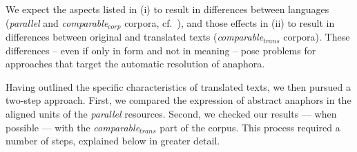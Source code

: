 \documentclass[output=paper]{LSP/langsci}
\begin{document}
We expect the aspects listed in (i) to result in differences between languages (\textit{parallel} and \textit{comparable$_{corp}$} corpora, cf.\ ), and those effects in (ii) to result in differences between original and translated texts (\textit{comparable$_{trans}$} corpora). These differences -- even if only in form and not in meaning -- pose problems for approaches that target the automatic resolution of anaphora. 


Having outlined the specific characteristics of translated texts, we then pursued a two-step approach.  First, we compared the expression of abstract anaphors in the aligned units of the  \textit{parallel} resources. Second, we checked our results --- when possible --- with the \textit{comparable$_{trans}$} part of the corpus. This process required a number of steps, explained below in greater detail.
\end{document}
